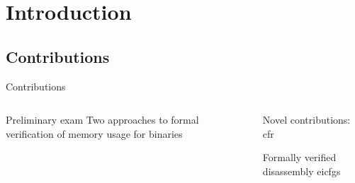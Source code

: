 \section{Introduction}

\subsection{Contributions}

\begin{frame}{Contributions}
  \begin{columns}[t]
    \begin{block}{Preliminary exam}
      Two approaches to \alert{formal verification of memory usage for binaries}
      
      \hyperlink{floyd}{}
      \hyperlink{hoare}{}
    \end{block}

    \begin{alertblock}{Novel contributions: \gls{cfr}}
      \begin{outline}
        \1 Formally verified disassembly
        \1 \Glspl{eicfg}
      \end{outline}
    \end{alertblock}
  \end{columns}
\end{frame}

